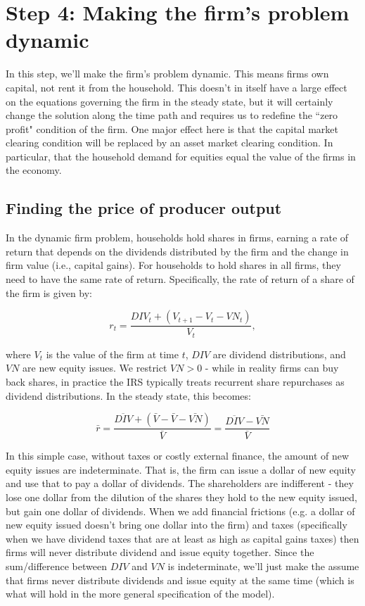 \documentclass[letterpaper,12pt]{article}
\theoremstyle{definition}
\begin{document}
\section*{Step 4: Making the firm's problem dynamic}

In this step, we'll make the firm's problem dynamic. This means firms own capital, not rent it from the household.  This doesn't in itself have a large effect on the equations governing the firm in the steady state, but it will certainly change the solution along the time path and requires us to redefine the ``zero profit" condition of the firm. One major effect here is that the capital market clearing condition will be replaced by an asset market clearing condition.  In particular, that the household demand for equities equal the value of the firms in the economy.

\subsection*{Finding the price of producer output}

In the dynamic firm problem, households hold shares in firms, earning a rate of return that depends on the dividends distributed by the firm and the change in firm value (i.e., capital gains).  For households to hold shares in all firms, they need to have the same rate of return.  Specifically, the rate of return of a share of the firm is given by:

\begin{equation}
\label{eqn:equity_return}
r_{t} = \frac{DIV_{t}+(V_{t+1}-V_{t}-VN_{t})}{V_{t}},
\end{equation} 

\noindent\noindent where $V_{t}$ is the value of the firm at time $t$, $DIV$ are dividend distributions, and $VN$ are new equity issues.  We restrict $VN>0$ - while in reality firms can buy back shares, in practice the IRS typically treats recurrent share repurchases as dividend distributions.  In the steady state, this becomes:

\begin{equation}
\label{eqn:equity_return}
\bar{r} = \frac{\overline{DIV}+(\bar{V}-\bar{V}-\bar{VN})}{\bar{V}}=\frac{\overline{DIV}-\bar{VN}}{\bar{V}}
\end{equation} 

\noindent\noindent  In this simple case, without taxes or costly external finance, the amount of new equity issues are indeterminate.  That is, the firm can issue a dollar of new equity and use that to pay a dollar of dividends.  The shareholders are indifferent - they lose one dollar from the dilution of the shares they hold to the new equity issued, but gain one dollar of dividends.  When we add financial frictions (e.g. a dollar of new equity issued doesn't bring one dollar into the firm) and taxes (specifically when we have dividend taxes that are at least as high as capital gains taxes) then firms will never distribute dividend and issue equity together.  Since the sum/difference between $DIV$ and $VN$ is indeterminate, we'll just make the assume that firms never distribute dividends and issue equity at the same time (which is what will hold in the more general specification of the model).  
\end{document}
